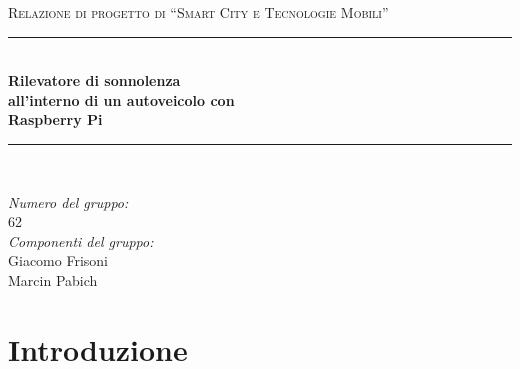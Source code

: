 \documentclass[12pt]{article}
\newcommand{\quotes}[1]{``#1''}
\begin{document}

\begin{titlepage}

\newcommand{\HRule}{\rule{\linewidth}{0.5mm}}

\center

\textsc{\Large Relazione di progetto di \quotes{Smart City e Tecnologie Mobili}}\\[0.5cm]

\HRule \\[0.4cm]
{
	\huge \bfseries
	Rilevatore di sonnolenza\\
	all'interno di un autoveicolo con\\
	Raspberry Pi\\[0.4cm]
}
\HRule \\[1.5cm]

\vfill

\begin{flushleft}
\emph{Numero del gruppo:}\\
62\\[1cm]
\emph{Componenti del gruppo:}\\
Giacomo Frisoni\\
Marcin Pabich\\[3cm]
\end{flushleft}

\end{titlepage}


\tableofcontents

\newpage


\section{Introduzione}
\end{document}
